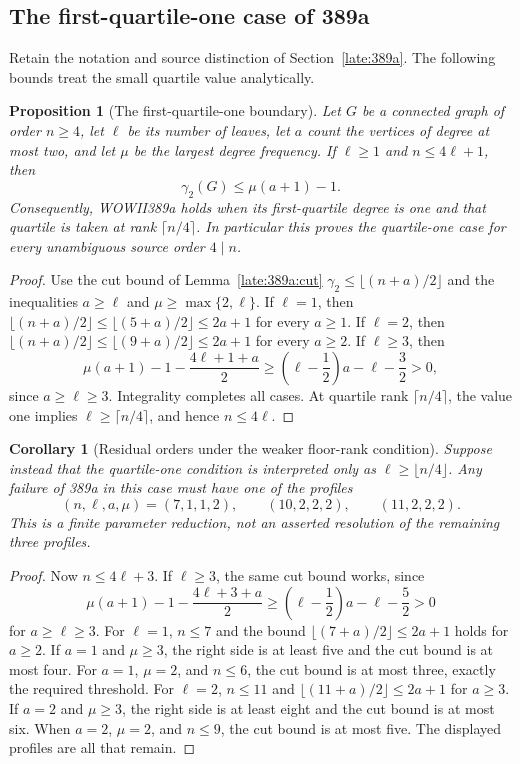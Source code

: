 \documentclass[11pt,a4paper]{article}
\newtheorem{proposition}[theorem]{Proposition}
\newtheorem{corollary}[theorem]{Corollary}
\theoremstyle{definition}\newtheorem{definition}[theorem]{Definition}
\theoremstyle{remark}\newtheorem{remark}[theorem]{Remark}
\begin{document}
\subsection{The first-quartile-one case of 389a}
\label{revision:389q1}
Retain the notation and source distinction of Section~\ref{late:389a}.
The following bounds treat the small quartile value analytically.
\begin{proposition}[The first-quartile-one boundary]
Let $G$ be a connected graph of order $n\ge4$, let $\ell$ be its number
of leaves, let $a$ count the vertices of degree at most two, and let
$\mu$ be the largest degree frequency. If $\ell\ge1$ and
$n\le4\ell+1$, then
\[
 \gamma_2(G)\le\mu(a+1)-1.
\]
Consequently, WOWII389a holds when its first-quartile degree is one
and that quartile is taken at rank $\lceil n/4\rceil$. In particular
this proves the quartile-one case for every unambiguous source order
$4\mid n$.
\end{proposition}
\begin{proof}
Use the cut bound of Lemma~\ref{late:389a:cut}
$\gamma_2\le\lfloor(n+a)/2\rfloor$ and the inequalities
$a\ge\ell$ and $\mu\ge\max\{2,\ell\}$.
If $\ell=1$, then
$\lfloor(n+a)/2\rfloor\le\lfloor(5+a)/2\rfloor\le2a+1$
for every $a\ge1$.
If $\ell=2$, then
$\lfloor(n+a)/2\rfloor\le\lfloor(9+a)/2\rfloor\le2a+1$
for every $a\ge2$.
If $\ell\ge3$, then
\[
 \mu(a+1)-1-\frac{4\ell+1+a}{2}
 \ge\left(\ell-\frac12\right)a-\ell-\frac32>0,
\]
since $a\ge\ell\ge3$. Integrality completes all cases.
At quartile rank $\lceil n/4\rceil$, the value one implies
$\ell\ge\lceil n/4\rceil$, and hence $n\le4\ell$.
\end{proof}

\begin{corollary}[Residual orders under the weaker floor-rank condition]
Suppose instead that the quartile-one condition is interpreted only as
$\ell\ge\lfloor n/4\rfloor$. Any failure of 389a in this case must
have one of the profiles
\[
 (n,\ell,a,\mu)=(7,1,1,2),\qquad(10,2,2,2),\qquad(11,2,2,2).
\]
This is a finite parameter reduction, not an asserted resolution of the
remaining three profiles.
\end{corollary}
\begin{proof}
Now $n\le4\ell+3$. If $\ell\ge3$, the same cut bound works, since
\[
 \mu(a+1)-1-\frac{4\ell+3+a}{2}
 \ge\left(\ell-\frac12\right)a-\ell-\frac52>0
\]
for $a\ge\ell\ge3$.
For $\ell=1$, $n\le7$ and the bound
$\lfloor(7+a)/2\rfloor\le2a+1$ holds for $a\ge2$.
If $a=1$ and $\mu\ge3$, the right side is at least five and the
cut bound is at most four. For $a=1$, $\mu=2$, and $n\le6$,
the cut bound is at most three, exactly the required threshold.
For $\ell=2$, $n\le11$ and
$\lfloor(11+a)/2\rfloor\le2a+1$ for $a\ge3$.
If $a=2$ and $\mu\ge3$, the right side is at least eight and the
cut bound is at most six. When $a=2$, $\mu=2$, and $n\le9$,
the cut bound is at most five. The displayed profiles are all that remain.
\end{proof}
\end{document}

